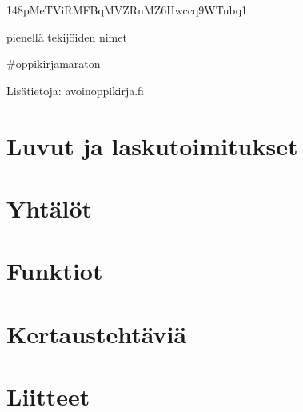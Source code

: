 148pMeTViRMFBqMVZRnMZ6Hwccq9WTubq1


pienellä tekijöiden nimet

\#oppikirjamaraton


Lisätietoja: avoinoppikirja.fi


\tableofcontents



\part{Luvut ja laskutoimitukset}
    
    
    
    
    
    
    
    
    

\part{Yhtälöt}
    
    
    
    
    

\part{Funktiot}
    
    
    
    
    
    

\part{Kertaustehtäviä}
    
    
    

\part*{Liitteet}
\appendix
    
    
    
    
    
    
    
    
    
    

